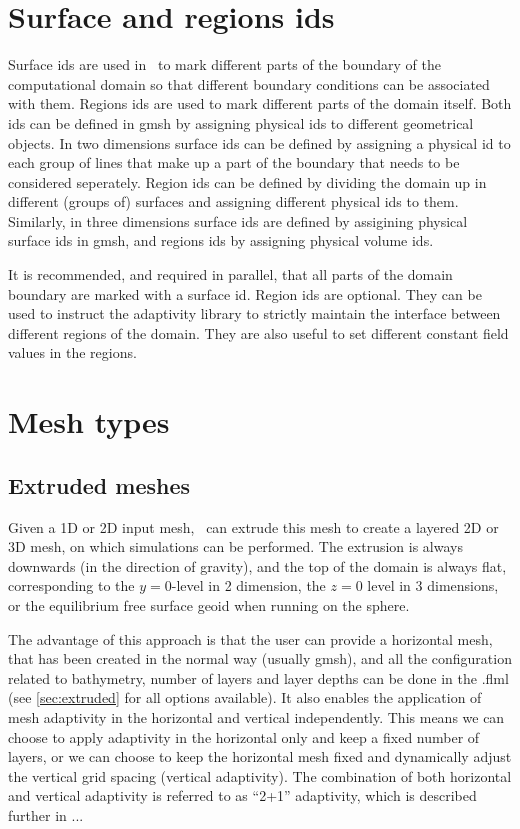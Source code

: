 \section{Surface and regions ids}
Surface ids are used in \fluidity\ to mark different parts of the boundary of the
computational domain so that different boundary conditions can be associated
with them. Regions ids are used to mark different parts of the domain itself.
Both ids can be defined in gmsh by assigning physical ids to different
geometrical objects. In two dimensions surface ids can be defined by assigning a
physical id to each group of lines that make up a part of the boundary that
needs to be considered seperately. Region ids can be defined by dividing the
domain up in different (groups of) surfaces and assigning different 
physical ids to them. Similarly, in three dimensions surface ids are defined by
assigining physical surface ids in gmsh, and regions ids by assigning physical
volume ids.

It is recommended, and required in parallel, that all parts of the domain
boundary are marked with a surface id. Region ids are optional. They can be used
to instruct the adaptivity library to strictly maintain the interface between 
different regions of the domain. They are also useful to set different constant 
field values in the regions.

\section{Mesh types}
\subsection{Extruded meshes}
\label{sec:extruded_meshes}

Given a 1D or 2D input mesh, \fluidity\ can extrude this
mesh to create a layered 2D or 3D mesh, on which simulations can be
performed. The extrusion is always downwards (in the direction of gravity), 
and the top of the domain is always flat, corresponding to the $y=0$-level 
in 2 dimension, the $z=0$ level in 3 dimensions, or the equilibrium 
free surface geoid when running on the sphere.

The advantage of this approach is that the user can provide a horizontal mesh,
that has been created in the normal way (usually gmsh), and all the
configuration related to bathymetry, number of layers and layer depths can be
done in the .flml (see \ref{sec:extruded} for all options available). It also
enables the application of mesh adaptivity in the horizontal and vertical
independently. This means we can choose to apply adaptivity in the horizontal
only and keep a fixed number of layers, or we can choose to keep the horizontal
mesh fixed and dynamically adjust the vertical grid spacing (vertical
adaptivity). The combination of both horizontal and vertical adaptivity is
referred to as ``2+1'' adaptivity, which is described further in ...


